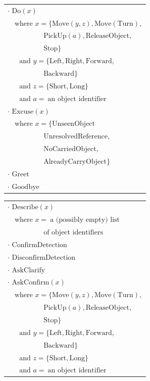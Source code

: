 \begin{table}[p!]
\begin{footnotesize}
\begin{tabular}{p{60mm}} 
$\cdot$ $\mathrm{Do}(x) $ \\ $ \ \ \ \text{ where } x=\{\mathrm{Move}(y,z), \mathrm{Move(Turn)},$ \\ $\ \ \ \ \ \ \ \ \ \ \ \ \ \ \ \ \ \ \ \ \ \ \ \mathrm{PickUp}(a),  \mathrm{ReleaseObject},$ \\ $\ \ \ \ \ \ \ \ \ \ \ \ \ \ \ \ \ \ \ \ \ \ \ \mathrm{Stop}\} $ \\ $ \ \ \ \ \ \ \text{ and } y = \{\mathrm{Left,Right,Forward,}$ \\ $ \ \ \ \ \ \ \ \ \ \ \ \ \ \ \ \ \ \ \ \ \ \ \ \mathrm{Backward}\} $ \\ $ \ \ \ \ \ \ \text{ and } z = \{\mathrm{Short,Long}\}$ \\ $ \ \ \ \ \ \  \text{ and } a = \ \text{an object identifier}$ \\
$\cdot$ $\mathrm{Excuse}(x) $ \\ $ \ \ \  \text{ where } x = \{\mathrm{UnseenObject}$ \\ $\ \ \ \ \ \ \ \ \ \ \ \ \ \ \ \ \ \ \ \ \ \ \ \mathrm{UnresolvedReference},$  \\ $\ \ \ \ \ \ \ \ \ \ \ \ \ \ \ \ \ \ \ \ \ \ \ \mathrm{NoCarriedObject,}$ \\ $\ \ \ \ \ \ \ \ \ \ \ \ \ \ \ \ \ \ \ \ \ \ \ \mathrm{AlreadyCarryObject}\}$ \\
$\cdot$ $\mathrm{Greet}$ \\
$\cdot$ $\mathrm{Goodbye}$ 
\end{tabular}
\hspace{2cm}
\begin{tabular}{p{60mm}} 
$\cdot$ $\mathrm{Describe}(x) $ \\ $ \ \ \  \text{ where } x = \ \text{a (possibly empty) list}$ \\ $ \ \ \ \ \ \ \ \ \ \ \ \ \ \ \ \ \ \ \ \ \ \ \  \text{of object identifiers}$ \\
$\cdot$ $\mathrm{ConfirmDetection}$ \\
$\cdot$ $\mathrm{DisconfirmDetection}$  \\
$\cdot$ $\mathrm{AskClarify}$ \\
$\cdot$ $\mathrm{AskConfirm}(x) $\\ $ \ \ \ \text{ where } x=\{\mathrm{Move}(y,z), \mathrm{Move(Turn)},$ \\ $\ \ \ \ \ \ \ \ \ \ \ \ \ \ \ \ \ \ \ \ \ \ \ \mathrm{PickUp}(a),  \mathrm{ReleaseObject},$ \\ $\ \ \ \ \ \ \ \ \ \ \ \ \ \ \ \ \ \ \ \ \ \ \ \mathrm{Stop}\} $ \\ $ \ \ \ \ \ \ \text{ and } y = \{\mathrm{Left,Right,Forward,}$ \\ $ \ \ \ \ \ \ \ \ \ \ \ \ \ \ \ \ \ \ \ \ \ \ \ \mathrm{Backward}\} $ \\ $ \ \ \ \ \ \ \text{ and } z = \{\mathrm{Short,Long}\}$ \\ $ \ \ \ \ \ \  \text{ and } a = \ \text{an object identifier}$ \end{tabular}

\end{footnotesize}
\end{table}
